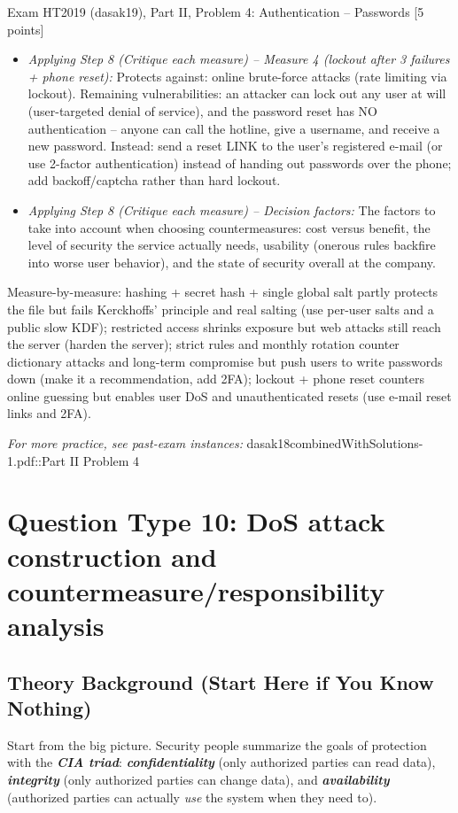 \documentclass[12pt, a4paper]{article}
\newcommand{\term}[1]{\textbf{\textit{#1}}}        %
\begin{document}
\begin{practicebox}{Exam HT2019 (dasak19), Part II, Problem 4: Authentication -- Passwords [5 points]}
\begin{itemize}
    \item \textit{Applying Step 8 (Critique each measure) -- Measure 4 (lockout after 3 failures + phone reset):} Protects against: online brute-force attacks (rate limiting via lockout). Remaining vulnerabilities: an attacker can lock out any user at will (user-targeted denial of service), and the password reset has NO authentication -- anyone can call the hotline, give a username, and receive a new password.
    Instead: send a reset LINK to the user's registered e-mail (or use 2-factor authentication) instead of handing out passwords over the phone; add backoff/captcha rather than hard lockout.
    \item \textit{Applying Step 8 (Critique each measure) -- Decision factors:} The factors to take into account when choosing countermeasures: cost versus benefit, the level of security the service actually needs, usability (onerous rules backfire into worse user behavior), and the state of security overall at the company.
\end{itemize}

\begin{answerbox}
Measure-by-measure: hashing + secret hash + single global salt partly protects the file but fails Kerckhoffs' principle and real salting (use per-user salts and a public slow KDF); restricted access shrinks exposure but web attacks still reach the server (harden the server); strict rules and monthly rotation counter dictionary attacks and long-term compromise but push users to write passwords down (make it a recommendation, add 2FA); lockout + phone reset counters online guessing but enables user DoS and unauthenticated resets (use e-mail reset links and 2FA).
\end{answerbox}
\end{practicebox}

\textit{For more practice, see past-exam instances:} dasak18combinedWithSolutions-1.pdf::Part II Problem 4

\section{Question Type 10: DoS attack construction and countermeasure/responsibility analysis}

\subsection*{Theory Background (Start Here if You Know Nothing)}

Start from the big picture. Security people summarize the goals of protection with the \term{CIA triad}: \term{confidentiality} (only authorized parties can read data), \term{integrity} (only authorized parties can change data), and \term{availability} (authorized parties can actually \emph{use} the system when they need to).
\end{document}
